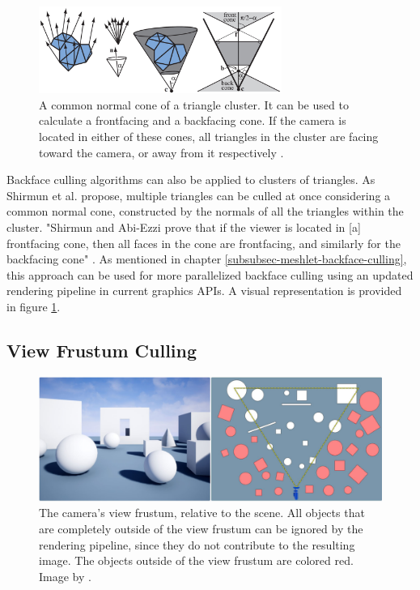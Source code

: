 \begin{figure}[h]
    \centering
    \includegraphics[width=300px]{images/graphics/cluster-backface-culling.jpg}
    \caption{A common normal cone of a triangle cluster. It can be used to calculate a frontfacing
    and a backfacing cone. If the camera is located in either of these cones, all triangles in the 
    cluster are facing toward the camera, or away from it respectively \cite{AkenineMoeller2018}.}
    \label{fig:cluster-backface-culling}
\end{figure}

\noindent 
Backface culling algorithms can also be applied to clusters of triangles. As Shirmun et al. \cite{Shirmun1993} 
propose, multiple triangles can be culled at once considering a common normal cone, constructed by the normals 
of all the triangles within the cluster. "Shirmun and Abi-Ezzi \cite{Shirmun1993} prove that if the viewer is 
located in [a] frontfacing cone, then all faces in the cone are frontfacing, and similarly for the backfacing 
cone" \cite{AkenineMoeller2018}. As mentioned in chapter \ref{subsubsec-meshlet-backface-culling}, this approach 
can be used for more parallelized backface culling using an updated rendering pipeline in current graphics 
\ac{API}s. A visual representation is provided in figure \ref{fig:cluster-backface-culling}.


\subsection*{View Frustum Culling} \label{subsec-view-frustum-culling}

\begin{figure}[h]
    \centering
    \includegraphics[width=\linewidth]{images/graphics/view-frustum-culling.jpg}
    \caption{The camera's view frustum, relative to the scene. All objects that are completely outside of 
    the view frustum can be ignored by the rendering pipeline, since they do not contribute to the resulting image.
    The objects outside of the view frustum are colored red. Image by \cite{Pan2020}.}
    \label{fig:view-frustum-culling}
\end{figure}

